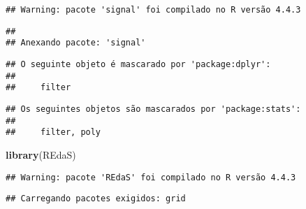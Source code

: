 \documentclass[
]{article}
\newenvironment{Shaded}{\begin{snugshade}}{\end{snugshade}}
\newcommand{\FunctionTok}[1]{\textcolor[rgb]{0.13,0.29,0.53}{\textbf{#1}}}
\newcommand{\NormalTok}[1]{#1}
\begin{document}
\begin{verbatim}
## Warning: pacote 'signal' foi compilado no R versão 4.4.3
\end{verbatim}

\begin{verbatim}
## 
## Anexando pacote: 'signal'
\end{verbatim}

\begin{verbatim}
## O seguinte objeto é mascarado por 'package:dplyr':
## 
##     filter
\end{verbatim}

\begin{verbatim}
## Os seguintes objetos são mascarados por 'package:stats':
## 
##     filter, poly
\end{verbatim}

\begin{Shaded}
\begin{Highlighting}[]
\FunctionTok{library}\NormalTok{(REdaS)}
\end{Highlighting}
\end{Shaded}

\begin{verbatim}
## Warning: pacote 'REdaS' foi compilado no R versão 4.4.3
\end{verbatim}

\begin{verbatim}
## Carregando pacotes exigidos: grid
\end{verbatim}
\end{document}
